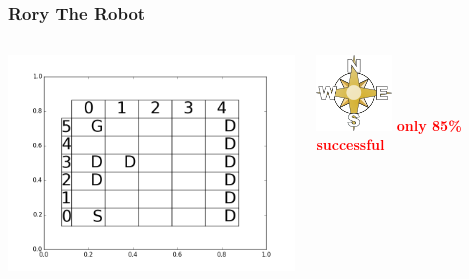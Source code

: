 \documentclass{beamer}
\begin{document}
  
  \begin{frame}
  	\frametitle{Rory The Robot}
	\begin{columns}[c]
		\includegraphics[width=8.5cm]{boardrory}
		\begin{center}
			\includegraphics[width=2cm]{compass} \newline \newline \newline
			\pause
			\huge{\textbf{\textcolor{red}{only 85\% successful}}}
		\end{center}
	\end{columns}
  \end{frame}
  
\end{document}
